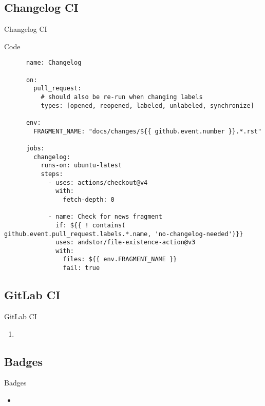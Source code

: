 \subsection{Changelog CI}
\begin{frame}[fragile]{Changelog CI}
  \begin{block}{Code}
    \footnotesize
    \begin{verbatim}
      name: Changelog

      on:
        pull_request:
          # should also be re-run when changing labels
          types: [opened, reopened, labeled, unlabeled, synchronize]

      env:
        FRAGMENT_NAME: "docs/changes/${{ github.event.number }}.*.rst"

      jobs:
        changelog:
          runs-on: ubuntu-latest
          steps:
            - uses: actions/checkout@v4
              with:
                fetch-depth: 0

            - name: Check for news fragment
              if: ${{ ! contains( github.event.pull_request.labels.*.name, 'no-changelog-needed')}}
              uses: andstor/file-existence-action@v3
              with:
                files: ${{ env.FRAGMENT_NAME }}
                fail: true
    \end{verbatim}
  \end{block}
\end{frame}

\subsection{GitLab CI}
\begin{frame}[fragile]{
    GitLab CI
    \hfill
  }
  \begin{enumerate}
    \item
  \end{enumerate}
\end{frame}

\subsection{Badges}
\begin{frame}[fragile]{Badges}
  \begin{itemize}
    \item
  \end{itemize}
\end{frame}

